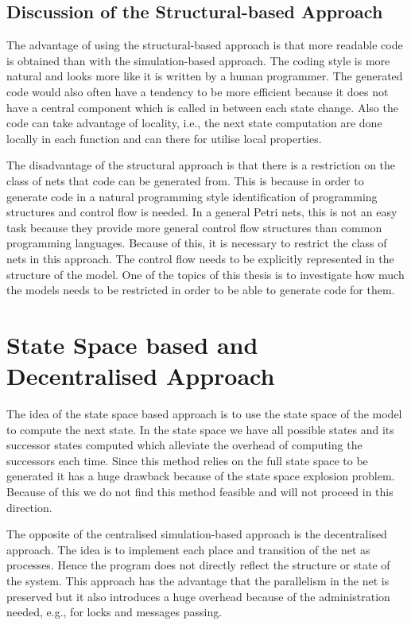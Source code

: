 \subsection{Discussion of the Structural-based Approach}
The advantage of using the structural-based approach is that more readable code is obtained than with the simulation-based approach. The coding style is more natural and looks more like it is written by a human programmer. The generated code would also often have a tendency to be more efficient because it does not have a central component which is called in between each state change. Also the code can take advantage of locality, i.e., the next state computation are done locally in each function and can there for utilise local properties.

The disadvantage of the structural approach is that there is a restriction on the class of nets that code can be generated from. This is because in order to generate code in a natural programming style identification of programming structures and control flow is needed. In a general Petri nets, this is not an easy task because they provide more general control flow structures than common programming languages. Because of this, it is necessary to restrict the class of nets in this approach. The control flow needs to be explicitly represented in the structure of the model. One of the topics of this thesis is to investigate how much the models needs to be restricted in order to be able to generate code for them.

\section{State Space based and Decentralised Approach}
The idea of the state space based approach is to use the state space of the model to compute the next state. In the state space we have all possible states and its successor states computed which alleviate the overhead of computing the successors each time. Since this method relies on the full state space to be generated it has a huge drawback because of the state space explosion problem. Because of this we do not find this method feasible and will not proceed in this direction.

The opposite of the centralised simulation-based approach is the decentralised approach. The idea is to implement each place and transition of the net as processes. Hence the program does not directly reflect the structure or state of the system. This approach has the advantage that the parallelism in the net is preserved but it also introduces a huge overhead because of the administration needed, e.g., for locks and messages passing.

